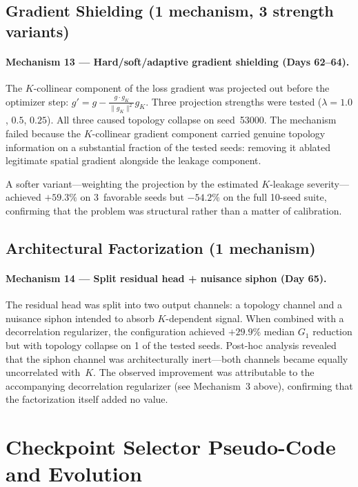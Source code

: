 \subsection{Gradient Shielding (1 mechanism, 3 strength variants)}

\paragraph{Mechanism 13 --- Hard/soft/adaptive gradient shielding (Days 62--64).} The $K$-collinear component of the loss gradient was projected out before the optimizer step: $g' = g - \frac{g \cdot g_K}{\|g_K\|^2} g_K$. Three projection strengths were tested ($\lambda = 1.0$, $0.5$, $0.25$). All three caused topology collapse on seed~53000. The mechanism failed because the $K$-collinear gradient component carried genuine topology information on a substantial fraction of the tested seeds: removing it ablated legitimate spatial gradient alongside the leakage component.

A softer variant---weighting the projection by the estimated $K$-leakage severity---achieved $+59.3\%$ on 3~favorable seeds but $-54.2\%$ on the full 10-seed suite, confirming that the problem was structural rather than a matter of calibration.

\subsection{Architectural Factorization (1 mechanism)}

\paragraph{Mechanism 14 --- Split residual head + nuisance siphon (Day 65).} The residual head was split into two output channels: a topology channel and a nuisance siphon intended to absorb $K$-dependent signal. When combined with a decorrelation regularizer, the configuration achieved $+29.9\%$ median $G_1$ reduction but with topology collapse on 1 of the tested seeds. Post-hoc analysis revealed that the siphon channel was architecturally inert---both channels became equally uncorrelated with~$K$. The observed improvement was attributable to the accompanying decorrelation regularizer (see Mechanism~3 above), confirming that the factorization itself added no value.

\onecolumngrid
\section{Checkpoint Selector Pseudo-Code and Evolution}
\label{app:selector}

